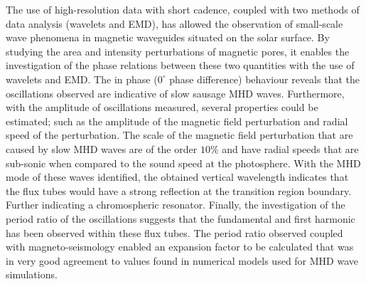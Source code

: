     The use of high-resolution data with short cadence, coupled with two methods of data analysis (wavelets and EMD), has allowed the observation of small-scale wave phenomena in magnetic waveguides situated on the solar surface.
    By studying the area and intensity perturbations of magnetic pores, it enables the investigation of the phase relations between these two quantities with the use of wavelets and EMD.
    The in phase ($0^\circ$ phase difference) behaviour reveals that the oscillations observed are indicative of slow sausage MHD waves. 
    Furthermore, with the amplitude of oscillations measured, several properties could be estimated; such as the amplitude of the magnetic field perturbation and radial speed of the perturbation.
    The scale of the magnetic field perturbation that are caused by slow MHD waves are of the order $10$\% and have radial speeds that are sub-sonic when compared to the sound speed at the photosphere.  
    With the MHD mode of these waves identified, the obtained vertical wavelength indicates that the flux tubes would have a strong reflection at the transition region boundary.
    Further indicating a chromospheric resonator. 
    Finally, the investigation of the period ratio of the oscillations suggests that the fundamental and first harmonic has been observed within these flux tubes.
    The period ratio observed coupled with magneto-seismology enabled an expansion factor to be calculated that was in very good agreement to values found in numerical models used for MHD wave simulations.